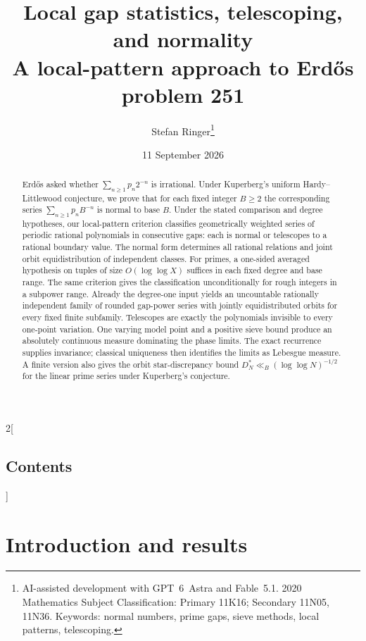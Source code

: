 \documentclass[11pt,a4paper]{article}
\title{Local gap statistics, telescoping, and normality\\
\large A local-pattern approach to Erd\H os problem 251}
\author{Stefan Ringer\thanks{AI-assisted development with GPT~6~Astra and Fable~5.1.
2020 Mathematics Subject Classification:
Primary 11K16; Secondary 11N05, 11N36.
Keywords: normal numbers, prime gaps, sieve methods, local patterns, telescoping.}}
\date{11 September 2026}
\begin{document}
\maketitle
\begin{abstract}
Erd\H os asked whether $\sum_{n\ge1}p_n2^{-n}$ is irrational.
Under Kuperberg's uniform Hardy--Littlewood conjecture, we prove that
for each fixed integer $B\ge2$ the corresponding series
$\sum_{n\ge1}p_nB^{-n}$ is normal to base $B$.
Under the stated comparison and degree hypotheses, our local-pattern
criterion classifies geometrically weighted series of periodic rational
polynomials in consecutive gaps: each is normal or
telescopes to a rational boundary value. The normal form determines
all rational relations and joint orbit equidistribution of independent classes.
For primes, a one-sided averaged hypothesis on tuples of size
$O(\log\log X)$ suffices in each fixed degree and base range.
The same criterion gives the classification unconditionally for rough
integers in a subpower range. Already the degree-one input yields an
uncountable rationally independent family of rounded gap-power series
with jointly equidistributed orbits for every fixed finite subfamily.
Telescopes are exactly the polynomials invisible to every one-point
variation. One varying model point and a positive sieve bound produce an
absolutely continuous measure dominating the phase limits. The exact
recurrence supplies invariance; classical uniqueness then identifies
the limits as Lebesgue measure.
A finite version also gives the orbit star-discrepancy bound
$D_N^*\ll_B(\log\log N)^{-1/2}$ for the linear prime series under
Kuperberg's conjecture.
\end{abstract}

\begin{multicols}{2}[\subsection*{Contents}]
\makeatletter
{}
\makeatother
\end{multicols}

\section{Introduction and results}\label{sec:statements}
\end{document}
